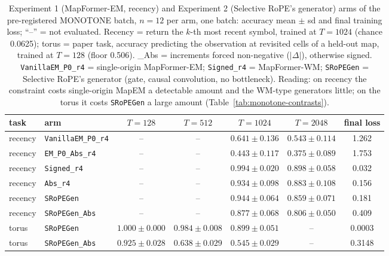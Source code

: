 \documentclass[10pt]{article}
\newcommand{\arm}[1]{\texttt{#1}}
\begin{document}
\begin{table}[h]
\centering
\small
\captionsetup{font=footnotesize,skip=4pt}
\caption{Experiment 1 (MapFormer-EM, recency) and Experiment 2 (Selective RoPE's generator) arms of the pre-registered MONOTONE batch, $n=12$ per arm, one batch: accuracy mean $\pm$ sd and final training loss; ``--'' = not evaluated. Recency = return the $k$-th most recent symbol, trained at $T=1024$ (chance 0.0625); torus = paper task, accuracy predicting the observation at revisited cells of a held-out map, trained at $T=128$ (floor 0.506). \_Abs = increments forced non-negative ($|\Delta|$), otherwise signed. \arm{VanillaEM\_P0\_r4} = single-origin MapFormer-EM; \arm{Signed\_r4} = MapFormer-WM; \arm{SRoPEGen} = Selective RoPE's generator (gate, causal convolution, no bottleneck). Reading: on recency the constraint costs single-origin MapEM a detectable amount and the WM-type generators little; on the torus it costs \arm{SRoPEGen} a large amount (Table~\ref{tab:monotone-contrasts}).}
\label{tab:monotone-arms}
\begin{tabular}{@{}llccccc@{}}
\toprule
task & arm & $T=128$ & $T=512$ & $T=1024$ & $T=2048$ & final loss \\
\midrule
recency & \arm{VanillaEM\_P0\_r4} & -- & -- & $0.641\pm0.136$ & $0.543\pm0.114$ & 1.262 \\
recency & \arm{EM\_P0\_Abs\_r4}   & -- & -- & $0.443\pm0.117$ & $0.375\pm0.089$ & 1.753 \\
recency & \arm{Signed\_r4}       & -- & -- & $0.994\pm0.020$ & $0.898\pm0.058$ & 0.032 \\
recency & \arm{Abs\_r4}          & -- & -- & $0.934\pm0.098$ & $0.883\pm0.108$ & 0.156 \\
recency & \arm{SRoPEGen}         & -- & -- & $0.944\pm0.064$ & $0.859\pm0.071$ & 0.181 \\
recency & \arm{SRoPEGen\_Abs}    & -- & -- & $0.877\pm0.068$ & $0.806\pm0.050$ & 0.409 \\
torus   & \arm{SRoPEGen}         & $1.000\pm0.000$ & $0.984\pm0.008$ & $0.899\pm0.051$ & -- & 0.0003 \\
torus   & \arm{SRoPEGen\_Abs}    & $0.925\pm0.028$ & $0.638\pm0.029$ & $0.545\pm0.029$ & -- & 0.3148 \\
\bottomrule
\end{tabular}
\end{table}
\end{document}
